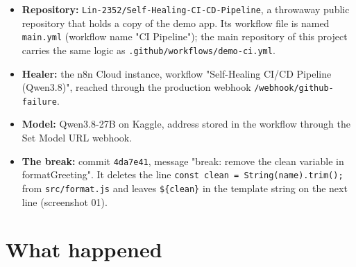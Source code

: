 \documentclass[11pt,a4paper]{report}
\begin{document}
\begin{itemize}[leftmargin=*,itemsep=2pt]
\item \textbf{Repository:} \texttt{Lin-\allowbreak{}2352/\allowbreak{}Self-\allowbreak{}Healing-\allowbreak{}CI-\allowbreak{}CD-\allowbreak{}Pipeline}, a throwaway public repository that holds a copy of the demo app. Its workflow file is named \texttt{main.\allowbreak{}yml} (workflow name "CI Pipeline"); the main repository of this project carries the same logic as \texttt{.\allowbreak{}github/\allowbreak{}workflows/\allowbreak{}demo-\allowbreak{}ci.\allowbreak{}yml}.
\item \textbf{Healer:} the n8n Cloud instance, workflow "Self-Healing CI/CD Pipeline (Qwen3.8)", reached through the production webhook \texttt{/\allowbreak{}webhook/\allowbreak{}github-\allowbreak{}failure}.
\item \textbf{Model:} Qwen3.8-27B on Kaggle, address stored in the workflow through the Set Model URL webhook.
\item \textbf{The break:} commit \texttt{4da7e41}, message "break: remove the clean variable in formatGreeting". It deletes the line \texttt{const clean = String(name).\allowbreak{}trim();} from \texttt{src/\allowbreak{}format.\allowbreak{}js} and leaves \texttt{\$\{clean\}} in the template string on the next line (screenshot 01).
\end{itemize}

\section{What happened}
\end{document}
